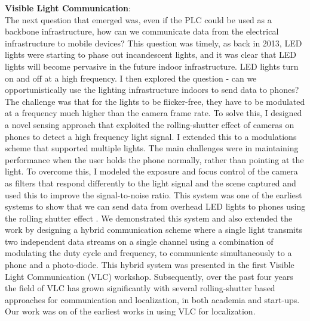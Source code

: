 \documentclass[10pt]{article}
\begin{document}
\textbf{Visible Light Communication}:\\ 

The next question that emerged was, even if the PLC could be used as a backbone infrastructure, how can we communicate data from the electrical infrastructure to mobile devices? This question was timely, as back in 2013, LED lights were starting to phase out incandescent lights, and it was clear that LED lights will become pervasive in the future indoor infrastructure. LED lights turn on and off at a high frequency. 
I then explored the question - can we opportunistically use the lighting infrastructure indoors to send data to phones? 
The challenge was that for the lights to be flicker-free, they have to be modulated at a frequency much higher than the camera frame rate. To solve this, I designed a novel sensing approach that exploited the rolling-shutter effect of cameras on phones to detect a high frequency light signal. I extended this to a modulations scheme that supported multiple lights. The main challenges were in maintaining performance when the user holds the phone normally, rather than pointing at the light. To overcome this, I modeled the exposure and focus control of the camera as filters that respond differently to the light signal and the scene captured and used this to improve the signal-to-noise ratio. This system was one of the earliest systems to show that we can send data from overhead LED lights to phones using the rolling shutter effect \cite{rajagopal2014visual}.  We demonstrated this system \cite{rajagopal2014demonstration} and also extended the work \cite{rajagopal2014hybrid} by designing a hybrid communication scheme where a single light transmits two independent data streams on a single channel using a combination of modulating the duty cycle and frequency, to communicate simultaneously to a phone and a photo-diode. This hybrid system was presented in the first Visible Light Communication (VLC) workshop. Subsequently, over the past four years the field of VLC has grown significantly with several rolling-shutter based approaches for communication and localization, in both academia and start-ups. Our work was on of the earliest works in using VLC for localization.
\end{document}
